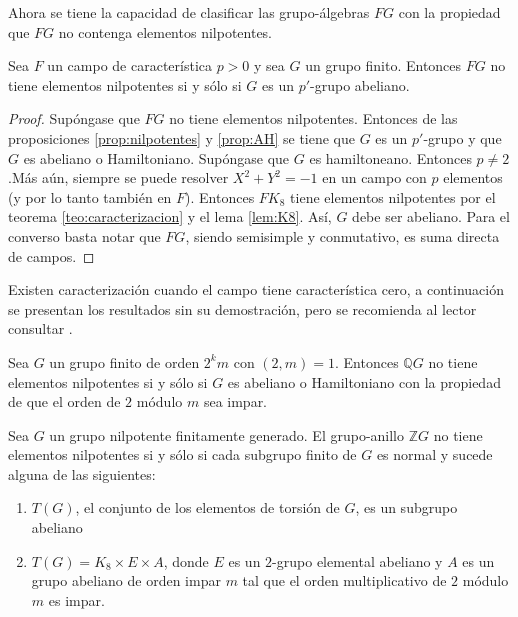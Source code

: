 Ahora se tiene la capacidad de clasificar las grupo-álgebras $FG$ con la propiedad que $FG$ no contenga elementos nilpotentes.
\begin{teorema}\label{teo:caracCarEntera}
Sea $F$ un campo de característica $p > 0$ y sea $G$ un grupo finito. Entonces $FG$ no tiene elementos nilpotentes si y sólo si $G$ es un $p'$-grupo abeliano. 
\end{teorema}
\begin{proof}
Supóngase que $FG$ no tiene elementos nilpotentes. Entonces de las proposiciones \ref{prop:nilpotentes} y \ref{prop:AH} se tiene que $G$ es un $p'$-grupo y que $G$ es abeliano o Hamiltoniano. Supóngase que $G$ es hamiltoneano. Entonces $p \neq 2$.Más aún, siempre se puede resolver $X^2 + Y^2 = -1$ en un campo con $p$ elementos (y por lo tanto también en $F$). Entonces $FK_8$ tiene elementos nilpotentes por el teorema \ref{teo:caracterizacion} y el lema \ref{lem:K8}. Así, $G$ debe ser abeliano.
Para el converso basta notar que $FG$, siendo semisimple y conmutativo, es suma directa de campos. 
\end{proof}

Existen caracterización cuando el campo tiene característica cero, a continuación se presentan los resultados sin su demostración, pero se recomienda al lector consultar \cite{bib:Sehgal}.
\begin{teorema}\label{teo:caracCar0}
Sea $G$ un grupo finito de orden $2^km$ con $(2,m) = 1$. Entonces $\mathds{Q}G$ no tiene elementos nilpotentes si y sólo si $G$ es abeliano o Hamiltoniano con la propiedad de que el orden de $2$ módulo $m$ sea impar. 
\end{teorema}

\begin{teorema}
Sea $G$ un grupo nilpotente finitamente generado. El grupo-anillo $\mathds{Z}G$ no tiene elementos nilpotentes si y sólo si cada subgrupo finito de $G$ es normal y sucede alguna de las siguientes:
\begin{enumerate}
\item $T(G)$, el conjunto de los elementos de torsión de $G$, es un subgrupo abeliano
\item $T(G) = K_8 \times E \times A$, donde $E$ es un $2$-grupo elemental abeliano y $A$ es un grupo abeliano de orden impar $m$ tal que el orden multiplicativo de $2$ módulo $m$ es impar.  
\end{enumerate}
\end{teorema}
